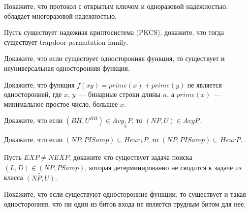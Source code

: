 \setcounter{curtask}{26}


\begin{task}
    Покажите, что протокол с открытым ключом и одноразовой надежностью, обладает
    многоразовой надежностью.
\end{task}

\begin{task}
    Пусть существует надежная криптосистема (PKCS), докажите, что тогда существует
    trapdoor permutation family.
\end{task}

\begin{task}
    Докажите, что если существует односторонняя функция, то существует и
    неуниверсальная односторонняя функция.
\end{task}

\breakline

\begin{ptask}{12}
    Докажите, что функция $f(xy) = prime(x) + prime(y)$ не является односторонней,
    где $x$, $y$~--- бинарные строки длины $n$, а $prime(x)$~--- минимальное простое
    число, большее $x$.
\end{ptask}

\begin{ptask}{20}
    Докажите, что если $(BH, U^{BH}) \in Avg_{\frac{1}{n}}P$, то $(NP, U) \in AvgP$.
\end{ptask}

\begin{ptask}{21}
    Докажите, что если $(NP, PISamp) \subseteq Heur_{\frac{1}{n}}P$, то $(NP, PISamp)
    \subseteq HeurP$.
\end{ptask}

\begin{ptask}{22}
    Пусть $EXP \neq NEXP$, докажите что существует задача поиска $(L, D) \in
    \widetilde{(NP, PSamp)}$,
    которая детерминированно не сводится к задаче из класса $\widetilde{(NP, U)}$.
\end{ptask}

\begin{ptask}{24}
    Покажите, что если существуют односторонние функции, то существует и такая
    односторонняя, что ни один из битов входа не является трудным битом для нее.
\end{ptask}